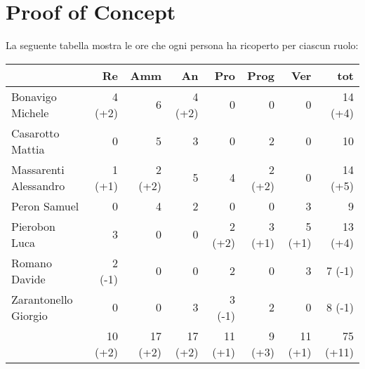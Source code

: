 \section{Proof of Concept}

La seguente tabella mostra le ore che ogni persona ha ricoperto per ciascun ruolo:
\begin{table}[H]
    \begin{tabularx}{\linewidth}{X|rrrrrrr}
    \rowcolor{gray!30}& Re & Amm & An & Pro & Prog & Ver & tot \\
    \hline
    Bonavigo Michele                        & 4 (+2)     & 6        & 4 (+2)    & 0         & 0        & 0         & 14 (+4) \\

    \rowcolor{gray!10}Casarotto Mattia      & 0          & 5        & 3         & 0         & 2        & 0         & 10 \\

    Massarenti Alessandro                   & 1 (+1)     & 2 (+2)   & 5         & 4         & 2 (+2)   & 0         & 14 (+5) \\

    \rowcolor{gray!10}Peron Samuel          & 0          & 4        & 2         & 0         & 0        & 3         & 9 \\ 

    Pierobon Luca                           & 3          & 0        & 0         & 2 (+2)    & 3 (+1)   & 5 (+1)    & 13 (+4) \\ 

    \rowcolor{gray!10}Romano Davide         & 2 (-1)     & 0        & 0         & 2         & 0        & 3         & 7 (-1) \\ 

    Zarantonello Giorgio                    & 0          & 0        & 3         & 3 (-1)    & 2        & 0         & 8 (-1) \\ 

    \hline                                  & 10 (+2)    & 17 (+2)  & 17 (+2)   & 11 (+1)   & 9 (+3)   & 11 (+1)   & 75 (+11) \\  
    \end{tabularx}
\end{table} 

